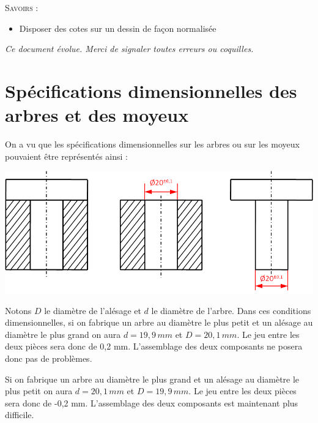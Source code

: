 \documentclass[11pt,oneside]{article}
\begin{document}
\begin{savoir}
\textsc{Savoirs :}
\begin{itemize}
\item Disposer des cotes sur un dessin de façon normalisée
\end{itemize}
\end{savoir}
 

\setlength{\parskip}{0ex plus 0.2ex minus 0ex}
 \renewcommand{\contentsname}{}
 \renewcommand{\baselinestretch}{1}

\tableofcontents

 \renewcommand{\baselinestretch}{1.2}
\setlength{\parskip}{2ex plus 0.5ex minus 0.2ex}

\textit{Ce document évolue. Merci de signaler toutes erreurs ou coquilles.}




\section{Spécifications dimensionnelles des arbres et des moyeux}

On a vu que les spécifications dimensionnelles sur les arbres ou sur les moyeux pouvaient être représentés ainsi : 

\begin{center}
\includegraphics[width=.9\textwidth]{png/fig1.png}
\end{center}

Notons $D$ le diamètre de l'alésage et $d$ le diamètre de l'arbre. Dans ces conditions dimensionnelles, si on fabrique un arbre au diamètre le plus petit et un alésage au diamètre le plus grand on aura $d = 19,9\, mm$ et $D = 20,1\, mm$. Le jeu entre les deux pièces sera donc de 0,2 mm. L'assemblage des deux composants ne posera donc pas de problèmes.

Si on fabrique un arbre au diamètre le plus grand et un alésage au diamètre le plus petit on aura $d = 20,1\, mm$ et $D = 19,9\, mm$. Le jeu entre les deux pièces sera donc de -0,2 mm. L'assemblage des deux composants est maintenant plus difficile. 
\end{document}
